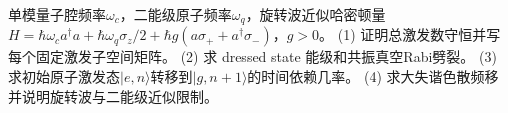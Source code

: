 单模量子腔频率\(\omega_c\)，二能级原子频率\(\omega_q\)，旋转波近似哈密顿量\(H=\hbar\omega_ca^\dagger a+\hbar\omega_q\sigma_z/2+\hbar g(a\sigma_++a^\dagger\sigma_-)\)，\(g>0\)。
(1) 证明总激发数守恒并写每个固定激发子空间矩阵。
(2) 求 dressed state 能级和共振真空Rabi劈裂。
(3) 求初始原子激发态\(|e,n\rangle\)转移到\(|g,n+1\rangle\)的时间依赖几率。
(4) 求大失谐色散频移并说明旋转波与二能级近似限制。
